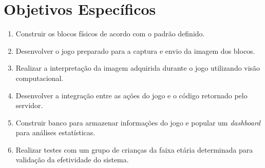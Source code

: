 \section{Objetivos Específicos}

\begin{enumerate}
    \item Construir os blocos físicos de acordo com o padrão definido.
    \item Desenvolver o jogo preparado para a captura e envio da imagem dos blocos.
    \item Realizar a interpretação da imagem adquirida durante o jogo utilizando visão computacional.
    \item Desenvolver a integração entre as ações do jogo e o código retornado pelo servidor.
    \item Construir banco para armazenar informações do jogo e popular um \textit{dashboard} para análises estatísticas.
    \item Realizar testes com um grupo de crianças da faixa etária determinada para validação da efetividade do sistema.
\end{enumerate}
